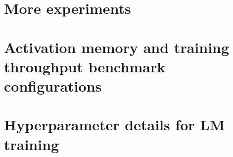 % 


\section{More experiments}\label{sec:appendix:more_experiments}



\section{Activation memory and training throughput benchmark configurations} \label{sec:appendix:config}



\section{Hyperparameter details for LM training} \label{sec:appendix:exp-details}








